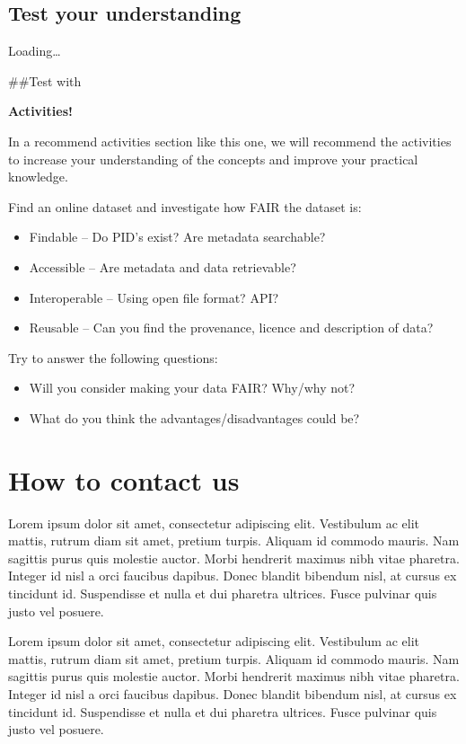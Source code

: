 \documentclass[
]{book}
\providecommand{\tightlist}{%
  \setlength{\itemsep}{0pt}\setlength{\parskip}{0pt}}
\begin{document}
\hypertarget{test-your-understanding-1}{%
\section{Test your understanding}\label{test-your-understanding-1}}

Loading\ldots{}

\#\#Test with

\textbf{Activities!}

In a recommend activities section like this one, we will recommend the activities to increase your understanding of the concepts and improve your practical knowledge.

Find an online dataset and investigate how FAIR the dataset is:

\begin{itemize}
\tightlist
\item
  Findable -- Do PID's exist? Are metadata searchable?
\item
  Accessible -- Are metadata and data retrievable?
\item
  Interoperable -- Using open file format? API?
\item
  Reusable -- Can you find the provenance, licence and description of data?
\end{itemize}

Try to answer the following questions:

\begin{itemize}
\tightlist
\item
  Will you consider making your data FAIR? Why/why not?
\item
  What do you think the advantages/disadvantages could be?
\end{itemize}

\hypertarget{how-to-contact-us}{%
\chapter{How to contact us}\label{how-to-contact-us}}

Lorem ipsum dolor sit amet, consectetur adipiscing elit. Vestibulum ac elit mattis, rutrum diam sit amet, pretium turpis. Aliquam id commodo mauris. Nam sagittis purus quis molestie auctor. Morbi hendrerit maximus nibh vitae pharetra. Integer id nisl a orci faucibus dapibus. Donec blandit bibendum nisl, at cursus ex tincidunt id. Suspendisse et nulla et dui pharetra ultrices. Fusce pulvinar quis justo vel posuere.

Lorem ipsum dolor sit amet, consectetur adipiscing elit. Vestibulum ac elit mattis, rutrum diam sit amet, pretium turpis. Aliquam id commodo mauris. Nam sagittis purus quis molestie auctor. Morbi hendrerit maximus nibh vitae pharetra. Integer id nisl a orci faucibus dapibus. Donec blandit bibendum nisl, at cursus ex tincidunt id. Suspendisse et nulla et dui pharetra ultrices. Fusce pulvinar quis justo vel posuere.
\end{document}
